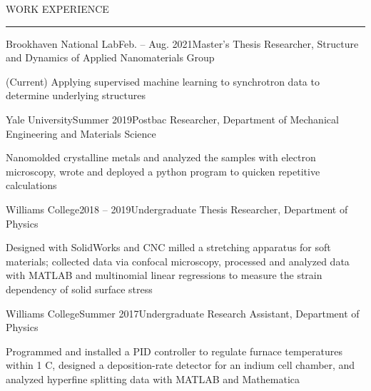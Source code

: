 \documentclass{short_resume} %
\renewenvironment{rSection}[1]{
	\sectionskip
	\textcolor{RoyalPurple}{\MakeUppercase{#1}}
	\sectionlineskip
	\hrule
	\begin{list}{}{
			\setlength{\leftmargin}{1.5em}
		}
		\item[]
	}{
	\end{list}
}
\begin{document}
\vspace{-1.75em}		
	\begin{rSection}{Work Experience}
			\begin{rSubsection}{Brookhaven National Lab}{Feb. -- Aug. 2021}{Master's Thesis Researcher, Structure and Dynamics of Applied Nanomaterials Group}{}
			\item[] (Current) Applying supervised machine learning to synchrotron data to determine underlying structures
			\vspace{-.2em}
		\end{rSubsection}
		\vspace{-.2em}
		\begin{rSubsection}{Yale University}{Summer 2019}{Postbac Researcher, Department of Mechanical Engineering and Materials Science}{}
			\item[] Nanomolded crystalline metals and analyzed the samples with electron microscopy, wrote and deployed a python program to quicken repetitive calculations 
			\vspace{-.2em}
		\end{rSubsection}
		\vspace{-.2em}
		\begin{rSubsection}{Williams College}{2018 -- 2019}{Undergraduate Thesis Researcher, Department of Physics}{}
			\item[] Designed with SolidWorks and CNC milled a stretching apparatus for soft materials; collected data via confocal microscopy, processed and analyzed data with MATLAB and multinomial linear regressions to measure the strain dependency of solid surface stress
		\end{rSubsection}
		\vspace{-.2em}
		\begin{rSubsection}{Williams College}{Summer 2017}{Undergraduate Research Assistant, Department of Physics}{}
			\item[] Programmed and installed a PID controller to regulate furnace temperatures within 1 \degree C, designed a deposition-rate detector for an indium cell chamber, and analyzed hyperfine splitting data with MATLAB and Mathematica
		\end{rSubsection}


\end{rSection}
\end{document}
